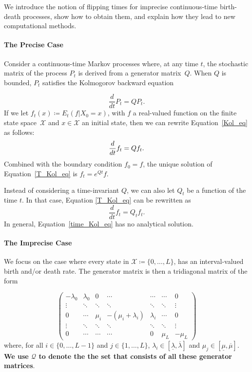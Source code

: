 \documentclass{article}
\newcommand{\nats}{\mathbb{N}}
\newcommand{\statessymbol}{\mathcal{X}}
\newcommand{\stateset}{\statessymbol}
\begin{document}
We introduce the notion of flipping times for imprecise continuous-time birth-death processes, show how to obtain them, and explain how they lead to new computational methods.
\paragraph{The Precise Case} 
Consider a continuous-time Markov processes where, at any time $t$, the stochastic matrix of the process $P_{t}$ is derived from a generator matrix~$Q$.
When $Q$ is bounded, $P_{t}$ satisfies the Kolmogorov backward equation

\begin{equation} \label{Kol_eq}
\frac{d}{dt}P_{t}=QP_{t}.
\end{equation}
If we let $f_{t}(x)\coloneqq E_{t}(f\vert X_0=x)$, with $f$ a real-valued function on the finite state space~$\mathcal{X}$ and $x\in\mathcal{X}$ an initial state, then
we can rewrite Equation~\eqref{Kol_eq} as follows:
\begin{equation} \label{T_Kol_eq}
\frac{d}{dt}f_{t}=Qf_{t}.
\vspace{3pt}
\end{equation}
Combined with the boundary condition $f_0=f$, the unique solution of Equation~\eqref{T_Kol_eq} is $f_{t}=e^{Qt}f$.

Instead of considering a time-invariant $Q$, we can also let $Q_{t}$ be a function of the time $t$.
 In that case, Equation \eqref{T_Kol_eq} can be rewritten as
 \begin{equation} \label{time_Kol_eq}
\frac{d}{dt}f_{t}=Q_{t}f_{t}. 
\end{equation}
In general, Equation~\eqref{time_Kol_eq} has no analytical solution.
\paragraph{The Imprecise Case}We focus on the case where every state in $\stateset\coloneqq \{0,\ldots,L\}$, %
has an interval-valued birth and/or death rate. The generator matrix is then a tridiagonal matrix of the form 

\begin{equation*}
 \begin{pmatrix}
  -\lambda_{0} & \lambda_{0} & 0 & \cdots & \cdots & \cdots & 0 \\
  \vdots & \ddots & \ddots & \ddots & \ddots & \ddots & \vdots  \\
  0 & \cdots & \mu_{i} & -(\mu_{i}+\lambda_{i}) & \lambda_{i} & \cdots & 0 \\
  \vdots & \ddots & \ddots & \ddots & \ddots & \ddots & \vdots  \\
  0 & \cdots & \cdots &\cdots & 0 & \mu_{L} & -\mu_{L}
 \end{pmatrix}
\end{equation*}
where, for all $i\in\{0,\dots,L-1\}$ and $j\in\{1,\dots,L\}$, $\lambda_{i} \in [\underline{\lambda},\overline{\lambda}]$ and $\mu_{j} \in [\underline{\mu},\overline{\mu}]$. \textbf{We use $\mathcal{Q}$ to denote the the set that consists of all these generator matrices}.
\end{document}
